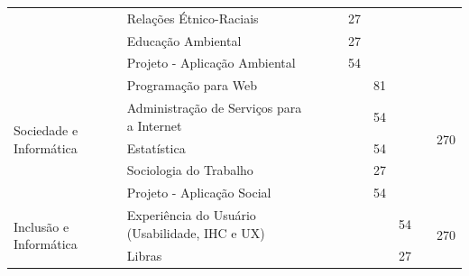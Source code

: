 \documentclass[11pt,fleqn]{book} %
\begin{document}
\begin{table}[]
{\begin{tabular}{|l|l|c|c|c|c|c|c|c|}
			& Relações Étnico-Raciais                                       &                 &                 & 27              &                 &                 &                 &                      \\ \cline{2-8}
			& Educação Ambiental                                            &                 &                 & 27              &                 &                 &                 &                      \\ \cline{2-8}
			& Projeto - Aplicação Ambiental                                 &                 &                 & 54              &                 &                 &                 &                      \\ \hline
			\multirow{5}{*}{Sociedade e Informática}                         
			& Programação para Web                                          &                 &                 &                 & 81              &                 &                 & \multirow{5}{*}{270} \\ \cline{2-8}
			& Administração de Serviços para a Internet                     &                 &                 &                 & 54              &                 &                 &                      \\ \cline{2-8}
			& Estatística                                                   &                 &                 &                 & 54              &                 &                 &                      \\ \cline{2-8}
			& Sociologia do Trabalho                                        &                 &                 &                 & 27              &                 &                 &                      \\ \cline{2-8}
			& Projeto - Aplicação Social                                    &                 &                 &                 & 54              &                 &                 &                      \\ \hline
			\multirow{6}{*}{Inclusão e Informática}                          
			& Experiência do Usuário (Usabilidade, IHC e UX)                &                 &                 &                 &                 & 54              &                 & \multirow{6}{*}{270} \\ \cline{2-8}
			& Libras                                                        &                 &                 &                 &                 & 27              &                 &                      \\ \cline{2-8}

\end{tabular}}
\end{table}
\end{document}
